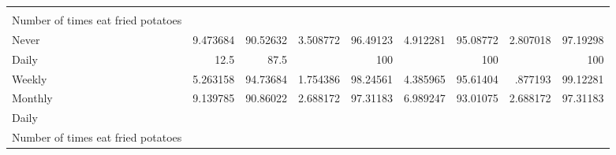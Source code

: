 \documentclass{article}
\begin{document}
\begin{tabular}{lllllllll}
  \multicolumn{1}{|r}{} &
  \multicolumn{1}{r}{} &
  \multicolumn{1}{r}{} &
  \multicolumn{1}{r}{} &
  \multicolumn{1}{r}{} &
  \multicolumn{1}{r}{} &
  \multicolumn{1}{r}{} &
  \multicolumn{1}{r}{} \\
\multicolumn{1}{l}{\hspace{6em}Number of times eat fried potatoes} &
  \multicolumn{1}{|r}{} &
  \multicolumn{1}{r}{} &
  \multicolumn{1}{r}{} &
  \multicolumn{1}{r}{} &
  \multicolumn{1}{r}{} &
  \multicolumn{1}{r}{} &
  \multicolumn{1}{r}{} &
  \multicolumn{1}{r}{} \\
\multicolumn{1}{l}{\hspace{7em}Never} &
  \multicolumn{1}{|r}{9.473684} &
  \multicolumn{1}{r}{90.52632} &
  \multicolumn{1}{r}{3.508772} &
  \multicolumn{1}{r}{96.49123} &
  \multicolumn{1}{r}{4.912281} &
  \multicolumn{1}{r}{95.08772} &
  \multicolumn{1}{r}{2.807018} &
  \multicolumn{1}{r}{97.19298} \\
\multicolumn{1}{l}{\hspace{7em}Daily} &
  \multicolumn{1}{|r}{12.5} &
  \multicolumn{1}{r}{87.5} &
  \multicolumn{1}{r}{} &
  \multicolumn{1}{r}{100} &
  \multicolumn{1}{r}{} &
  \multicolumn{1}{r}{100} &
  \multicolumn{1}{r}{} &
  \multicolumn{1}{r}{100} \\
\multicolumn{1}{l}{\hspace{7em}Weekly} &
  \multicolumn{1}{|r}{5.263158} &
  \multicolumn{1}{r}{94.73684} &
  \multicolumn{1}{r}{1.754386} &
  \multicolumn{1}{r}{98.24561} &
  \multicolumn{1}{r}{4.385965} &
  \multicolumn{1}{r}{95.61404} &
  \multicolumn{1}{r}{.877193} &
  \multicolumn{1}{r}{99.12281} \\
\multicolumn{1}{l}{\hspace{7em}Monthly} &
  \multicolumn{1}{|r}{9.139785} &
  \multicolumn{1}{r}{90.86022} &
  \multicolumn{1}{r}{2.688172} &
  \multicolumn{1}{r}{97.31183} &
  \multicolumn{1}{r}{6.989247} &
  \multicolumn{1}{r}{93.01075} &
  \multicolumn{1}{r}{2.688172} &
  \multicolumn{1}{r}{97.31183} \\
\multicolumn{1}{l}{\hspace{5em}Daily} &
  \multicolumn{1}{|r}{} &
  \multicolumn{1}{r}{} &
  \multicolumn{1}{r}{} &
  \multicolumn{1}{r}{} &
  \multicolumn{1}{r}{} &
  \multicolumn{1}{r}{} &
  \multicolumn{1}{r}{} &
  \multicolumn{1}{r}{} \\
\multicolumn{1}{l}{\hspace{6em}Number of times eat fried potatoes} &
  \multicolumn{1}{|r}{} &
  \multicolumn{1}{r}{} &
  \multicolumn{1}{r}{} &
  \multicolumn{1}{r}{} &

\end{tabular}
\end{document}
